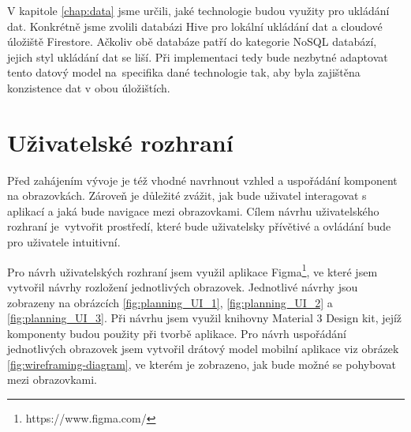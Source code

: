 \documentclass[czech, bc, kiv, he, iso690numb]{fasthesis}
\begin{document}
V kapitole \ref{chap:data} jsme určili, jaké technologie budou využity pro ukládání dat. Konkrétně jsme zvolili databázi Hive pro lokální ukládání dat a cloudové úložiště Firestore. Ačkoliv obě databáze patří do kategorie \gls{NoSQL} databází, jejich styl ukládání dat se liší. Při implementaci tedy bude nezbytné adaptovat tento datový model na~specifika dané technologie tak, aby byla zajištěna konzistence dat v obou úložištích.

\section{Uživatelské rozhraní}

Před zahájením vývoje je též vhodné navrhnout vzhled a uspořádání komponent na obrazovkách. Zároveň je důležité zvážit, jak bude uživatel interagovat s aplikací a jaká bude navigace mezi obrazovkami. Cílem návrhu uživatelského rozhraní je~vytvořit prostředí, které bude uživatelsky přívětivé a ovládání bude pro uživatele intuitivní. 

Pro návrh uživatelských rozhraní jsem využil aplikace Figma\footnote{https://www.figma.com/}, ve které jsem vytvořil návrhy rozložení jednotlivých obrazovek. Jednotlivé návrhy jsou zobrazeny na obrázcích \ref{fig:planning_UI_1}, \ref{fig:planning_UI_2} a \ref{fig:planning_UI_3}. Při návrhu jsem využil knihovny Material 3 Design kit, jejíž komponenty budou použity při tvorbě aplikace. Pro návrh uspořádání jednotlivých obrazovek jsem vytvořil drátový model mobilní aplikace viz obrázek \ref{fig:wireframing-diagram}, ve kterém je zobrazeno, jak bude možné se pohybovat mezi obrazovkami.
\end{document}
